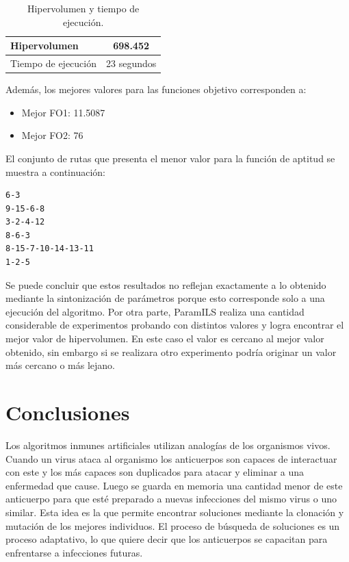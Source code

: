 \begin{table}[!htb]
\begin{center}
\begin{tabular}{|l|c|}
\hline
Hipervolumen & 698.452\\ \hline
Tiempo de ejecución & 23 segundos\\ \hline
\end{tabular}
\caption{Hipervolumen y tiempo de ejecución.}
\label{tab:mandldata}
\end{center}
\end{table}

Además, los mejores valores para las funciones objetivo corresponden a:
\begin{itemize}
\item Mejor FO1: 11.5087
\item Mejor FO2: 76
\end{itemize}

\newpage
El conjunto de rutas que presenta el menor valor para la función de aptitud se muestra a continuación:
\begin{verbatim}
6-3
9-15-6-8
3-2-4-12
8-6-3
8-15-7-10-14-13-11
1-2-5
\end{verbatim}

Se puede concluir que estos resultados no reflejan exactamente a lo obtenido mediante la sintonización de parámetros porque esto corresponde solo a una ejecución del algoritmo. Por otra parte, ParamILS realiza una cantidad considerable de experimentos probando con distintos valores y logra encontrar el mejor valor de hipervolumen. En este caso el valor es cercano al mejor valor obtenido, sin embargo si se realizara otro experimento podría originar un valor más cercano o más lejano.

\section{Conclusiones}

Los algoritmos inmunes artificiales utilizan analogías de los organismos vivos. Cuando un virus ataca al organismo los anticuerpos son capaces de interactuar con este y los más capaces son duplicados para atacar y eliminar a una enfermedad que cause. Luego se guarda en memoria una cantidad menor de este anticuerpo para que esté preparado a nuevas infecciones del mismo virus o uno similar. Esta idea es la que permite encontrar soluciones mediante la clonación y mutación de los mejores individuos. El proceso de búsqueda de soluciones es un proceso adaptativo, lo que quiere decir que los anticuerpos se capacitan para enfrentarse a infecciones futuras. \\

